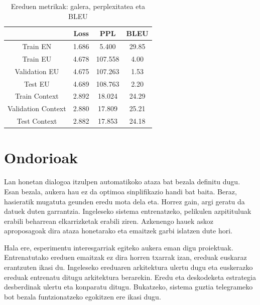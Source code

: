 \documentclass[11pt,a4paper]{article}
\begin{document}
\begin{table}
\centering
\begin{tabular}{ |c|c|c|c| } 
    \hline
    & Loss & PPL & BLEU \\
    \hline
    Train EN & 1.686 & 5.400 & 29.85 \\ 
    \hline
    Train EU & 4.678 & 107.558 & 4.00 \\ 
    Validation EU & 4.675 & 107.263 & 1.53 \\ 
    Test EU & 4.689 & 108.763 & 2.20 \\ 
    \hline
    Train Context & 2.892 & 18.024 & 24.29 \\ 
    Validation Context & 2.880 & 17.809 & 25.21 \\ 
    Test Context & 2.882 & 17.853 & 24.18 \\ 
    \hline
\end{tabular}
\caption{Ereduen metrikak: galera, perplexitatea eta BLEU}
\label{tab:metrics}
\end{table}

\section{Ondorioak}
Lan honetan dialogoa itzulpen automatikoko ataza bat bezala definitu dugu. Esan bezala, aukera hau ez da optimoa sinplifikazio handi bat baita. Beraz, hasieratik mugatuta geunden eredu mota dela eta. Horrez gain, argi geratu da datuek duten garrantzia. Ingeleseko sistema entrenatzeko, pelikulen azpitituluak erabili beharrean elkarrizketak erabili ziren. Azkenengo hauek askoz aproposagoak dira ataza honetarako eta emaitzek garbi islatzen dute hori. 

Hala ere, esperimentu interesgarriak egiteko aukera eman digu proiektuak. Entrenatutako ereduen emaitzak ez dira horren txarrak izan, ereduak euskaraz erantzuten ikasi du. Ingeleseko ereduaren arkitektura ulertu dugu eta euskerazko ereduak entrenatu ditugu arkitektura berarekin. Eredu eta deskodeketa estrategia desberdinak ulertu eta konparatu ditugu. Bukatzeko, sistema guztia telegrameko bot bezala funtzionatzeko egokitzen ere ikasi dugu.



\end{document}
